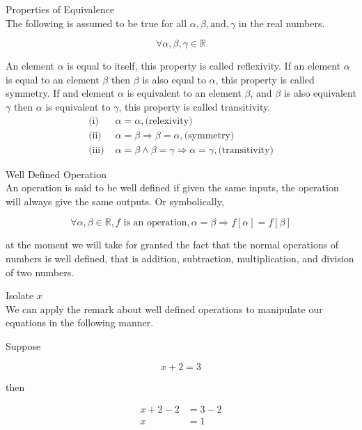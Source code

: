 \documentclass{book}
\begin{document}
  {\axiom Properties of Equivalence \\
     The following is assumed to be true for all $\alpha, \beta, \text{and}, \gamma$ in the real numbers.

    $$\forall \alpha, \beta, \gamma \in \mathbb{R}$$

     An element $\alpha$ is equal to itself, this property is called reflexivity. If an element $\alpha$ is equal to an element $\beta$ then $\beta$ is also equal to $\alpha$, this property is called symmetry. If and element $\alpha$ is equivalent to an element $\beta$, and $\beta$ is also equivalent $\gamma$ then $\alpha$ is equivalent to $\gamma$, this property is called transitivity.
    \begin{align*}
      \text{(i) } & \alpha = \alpha, \text{(relexivity)}\\
      \text{(ii) } & \alpha = \beta \Rightarrow \beta = \alpha, \text{(symmetry)}\\
      \text{(iii) } & \alpha = \beta \land \beta = \gamma \Rightarrow \alpha = \gamma, \text{(transitivity)}
    \end{align*}
  }

  {\axiom Well Defined Operation \\
     An operation is said to be well defined if given the same inputs, the operation will always give the same outputs. Or symbolically,

    $$\forall \alpha, \beta \in \mathbb{R}, f \text{ is an operation}, \alpha = \beta \Rightarrow f[\alpha] = f[\beta]$$

     at the moment we will take for granted the fact that the normal operations of numbers is well defined, that is addition, subtraction, multiplication, and division of two numbers.\\
  }

  {\example Isolate $x$ \\
     We can apply the remark about well defined operations to manipulate our equations in the following manner.

     Suppose

     $$x + 2 = 3$$

     then

    \begin{align}
      x + 2 - 2 & = 3 - 2\\
      x & = 1
    \end{align}
  }
\end{document}
